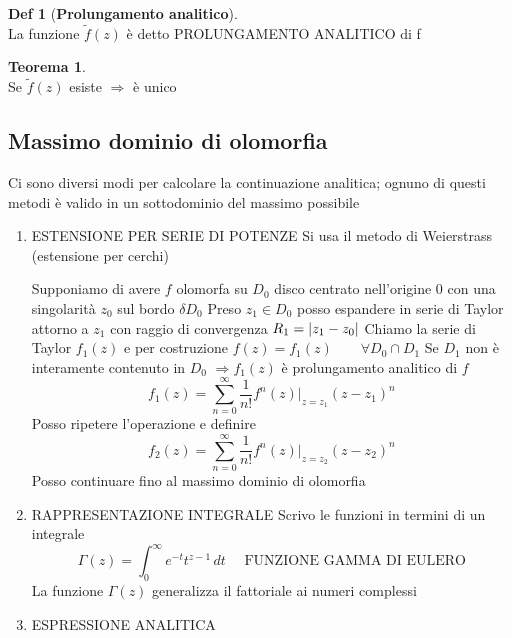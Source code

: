 \documentclass[a4paper,11pt]{report}
\theoremstyle{remark}
\theoremstyle{definition}
\newtheorem*{teo}{Teorema}
\newtheorem*{Def}{Def}
\DeclarePairedDelimiter{\abs}{\lvert}{\rvert}
\begin{document}
	\begin{Def}[\textbf{Prolungamento analitico}]\hfil\\
		La funzione  $\tilde{f}(z)$ è detto PROLUNGAMENTO ANALITICO di f
	\end{Def}

	\begin{teo}\hfil\\
		Se  $\tilde{f}(z)$ esiste $\Rightarrow$ è unico
	\end{teo}

\subsection{Massimo dominio di olomorfia}
	Ci sono diversi modi per calcolare la continuazione analitica; ognuno di questi metodi è valido in un sottodominio del massimo possibile
	
	\begin{enumerate}
		\item ESTENSIONE PER SERIE DI POTENZE \newline
		Si usa il metodo di Weierstrass (estensione per cerchi)
		
		\noindent Supponiamo di avere $f$ olomorfa su $D_0$ disco centrato nell'origine 0 con una singolarità $z_0$ sul bordo $\delta D_0$ \newline
		Preso $z_1 \in D_0$ posso espandere in serie di Taylor attorno a $z_1$ con raggio di convergenza  \newline $R_1 = \abs{z_1 - z_0}$ \newline
		Chiamo la serie di Taylor $f_1(z)$ e per costruzione $f(z) = f_1(z) \qquad \forall D_0 \cap D_1$ \newline
		Se $D_1$ non è interamente contenuto in $D_0$ $\Rightarrow f_1(z)$ è prolungamento analitico di $f$
		\begin{equation*}
			f_1(z) = \sum_{n=0}^{\infty} {\frac{1}{n!} f^n(z)\Big|_{z=z_1}(z-z_1)^n}
		\end{equation*}  
		Posso ripetere l'operazione e definire
		\begin{equation*}
			f_2(z) = \sum_{n=0}^{\infty} {\frac{1}{n!} f^n(z)\Big|_{z=z_2}(z-z_2)^n}
		\end{equation*}  
		Posso continuare fino al massimo dominio di olomorfia
		
		\item RAPPRESENTAZIONE INTEGRALE \newline
		Scrivo le funzioni in termini di un integrale
		\begin{equation}
			\Gamma(z) = \int_{0}^{\infty} e^{-t} t^{z-1}\,dt \quad \mbox{ FUNZIONE GAMMA DI EULERO}
		\end{equation}
		La funzione $\Gamma(z)$ generalizza il fattoriale ai numeri complessi
		
		\item ESPRESSIONE ANALITICA
	\end{enumerate}
\end{document}
